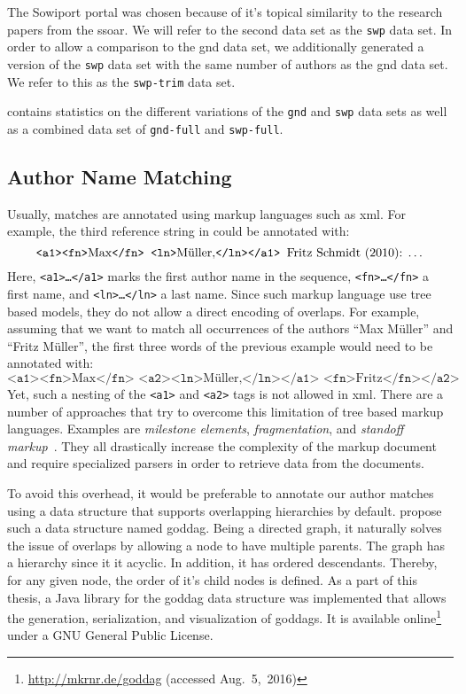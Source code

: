 The Sowiport portal was chosen because of it's topical similarity to the research papers from the \gls{ssoar}.
We will refer to the second data set as the \texttt{swp} data set.
In order to allow a comparison to the \gls{gnd} data set, we additionally generated a version of the \texttt{swp} data set with the same number of authors as the \gls{gnd} data set.
We refer to this as the \texttt{swp-trim} data set.

 contains statistics on the different variations of the \texttt{gnd} and \texttt{swp} data sets as well as a combined data set of \texttt{gnd-full} and \texttt{swp-full}.

\subsection{Author Name Matching}\label{subsec:i-author-name-matching}
Usually, matches are annotated using markup languages such as \gls{xml}.
For example, the third reference string in  could be annotated with:
\begin{equation*}
  \texttt{<a1><fn>}\text{Max}\texttt{</fn> <ln>}\text{M\"{u}ller,}\texttt{</ln></a1> }\text{Fritz Schmidt (2010): \dots}
\end{equation*}
Here, \texttt{<a1>\dots</a1>} marks the first author name in the sequence, \texttt{<fn>\dots</fn>} a first name, and \texttt{<ln>\dots</ln>} a last name.
Since such markup language use tree based models, they do not allow a direct encoding of overlaps.
For example, assuming that we want to match all occurrences of the authors ``Max M\"{u}ller'' and ``Fritz M\"{u}ller'', the first three words of the previous example would need to be annotated with:
\begin{equation*}
  \texttt{<a1><fn>}\text{Max}\texttt{</fn> <a2><ln>}\text{M\"{u}ller,}\texttt{</ln></a1> <fn>}\text{Fritz}\texttt{</fn></a2>}
\end{equation*}
Yet, such a nesting of the \texttt{<a1>} and \texttt{<a2>} tags is not allowed in \gls{xml}.
There are a number of approaches that try to overcome this limitation of tree based markup languages.
Examples are \textit{milestone elements}, \textit{fragmentation}, and \textit{standoff markup}~\citep{sperberg2000goddag}.
They all drastically increase the complexity of the markup document and require specialized parsers in order to retrieve data from the documents.

To avoid this overhead, it would be preferable to annotate our author matches using a data structure that supports overlapping hierarchies by default.
\citet{sperberg2000goddag} propose such a data structure named \acrfull{goddag}.
Being a directed graph, it naturally solves the issue of overlaps by allowing a node to have multiple parents.
The graph has a hierarchy since it it acyclic.
In addition, it has ordered descendants.
Thereby, for any given node, the order of it's child nodes is defined.
As a part of this thesis, a Java library for the \gls{goddag} data structure was implemented that allows the generation, serialization, and visualization of \glspl{goddag}.
It is available online\footnote{\url{http://mkrnr.de/goddag} (accessed Aug.~5,~2016)} under a GNU General Public License.

